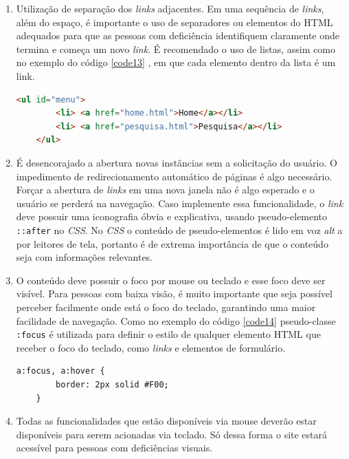 {{\begin{enumerate}
    \item Utilização de separação dos \textit{links} adjacentes. Em uma sequência de \textit{links}, além do espaço, é importante o uso de separadores ou elementos do HTML adequados para que as pessoas com deficiência identifiquem claramente onde termina e começa um novo \textit{link}. É recomendado o uso de listas, assim como no exemplo do código \ref{code13} , em que cada elemento dentro da lista é um link.
    {\begin{lstlisting}[language=html,caption={Separação de \textit{links} adjacentes usando a \textit{tag} li.}, label=code13]
    <ul id="menu">
        <li> <a href="home.html">Home</a></li>
        <li> <a href="pesquisa.html">Pesquisa</a></li>
    </ul>
    \end{lstlisting}}
    
    \item É desencorajado a abertura novas instâncias sem a solicitação do usuário. O impedimento de  redirecionamento automático de páginas é algo necessário. Forçar a abertura de \textit{links} em uma nova janela não é algo esperado e o usuário se perderá na navegação. Caso implemente essa funcionalidade, o \textit{link} deve possuir uma iconografia óbvia e explicativa, usando pseudo-elemento \lstinline{::after} no \textit{CSS}. No \textit{CSS}  o conteúdo de pseudo-elementos é lido em voz \textit{alt} a por leitores de tela, portanto é de extrema importância de que o conteúdo seja com informações relevantes.
    
    \item O conteúdo deve possuir o foco por mouse ou teclado e esse foco deve ser visível. Para pessoas com baixa visão, é muito importante que seja possível perceber facilmente onde está o foco do teclado, garantindo uma maior facilidade de navegação. Como no exemplo do código \ref{code14} pseudo-classe \lstinline{:focus} é utilizada para definir o estilo de qualquer elemento HTML que receber o foco do teclado, como \textit{links} e elementos de formulário.
    {\begin{lstlisting}[language=html,caption={Exemplo de como estilizar o o elemento nos estados de foco e hover.}, label=code14]
    a:focus, a:hover {
        border: 2px solid #F00;
    }
    \end{lstlisting}}
    
    \item Todas as funcionalidades que estão disponíveis via mouse deverão estar disponíveis para serem acionadas via teclado. Só dessa forma o site estará acessível para pessoas com deficiências visuais.
    
\end{enumerate}

}}



